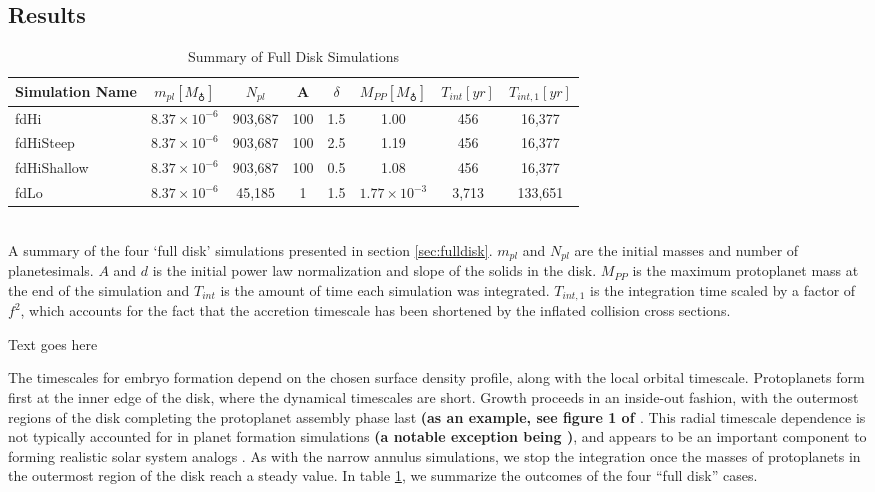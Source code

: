 \documentclass[twocolumn,linenumbers]{aastex63}
\begin{document}
\subsection{Results}

\begin{table}
\begin{center}
\caption{Summary of Full Disk Simulations}
\begin{tabular}{lccccccc} \hline \hline
Simulation Name & $m_{pl} [M_{\earth}]$ &$N_{pl}$ & A & $\delta$ & $M_{PP}  [M_{\earth}]$ & $T_{int} [yr]$ & $T_{int, 1} [yr]$ \\ \hline
fdHi              & $8.37 \times 10^{-6}$ & 903,687 & 100 & 1.5 & 1.00 & 456 & 16,377  \\
fdHiSteep    & $8.37 \times 10^{-6}$ & 903,687 & 100 & 2.5 & 1.19 & 456 & 16,377  \\
fdHiShallow & $8.37 \times 10^{-6}$ & 903,687 & 100 & 0.5 & 1.08 & 456 & 16,377 \\
fdLo             & $8.37 \times 10^{-6}$ & 45,185  & 1      & 1.5 & $1.77 \times 10^{-3}$ & 3,713 & 133,651 \\ \hline
\end{tabular}\\
A summary of the four `full disk' simulations presented in section \ref{sec:fulldisk}. $m_{pl}$ and $N_{pl}$ are the initial masses and number of planetesimals. $A$ and $d$ is the initial power law normalization and slope of the solids in the disk. $M_{PP}$ is the maximum protoplanet mass at the end of the simulation and $T_{int}$ is the amount of time each simulation was integrated. $T_{int, 1}$ is the integration time scaled by a factor of $f^{2}$, which accounts for the fact that the accretion timescale has been shortened by the inflated collision cross sections.
\label{tab:sim_properties}
\end{center}
Text goes here
\end{table}

The timescales for embryo formation depend on
the chosen surface density profile, along with the local orbital
timescale. Protoplanets form first at the inner edge of the disk,
where the dynamical timescales are short. Growth proceeds in an
inside-out fashion, with the outermost regions of the disk completing
the protoplanet assembly phase last \textbf{(as an example, see figure 1 of \citet{kokubo02}}. This radial timescale dependence is not typically
accounted for in planet formation simulations \textbf{(a notable exception being \citet{emsenhuber21a, emsenhuber21b})}, and appears to be an
important component to forming realistic solar system analogs
\citep{clement20}. As with the narrow annulus simulations, we stop the
integration once the masses of protoplanets in the outermost region of
the disk reach a steady value. In table \ref{tab:sim_properties}, we
summarize the outcomes of the four ``full disk'' cases.
\end{document}
